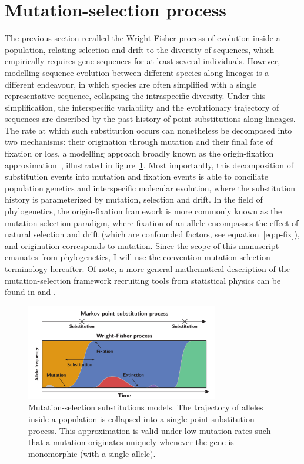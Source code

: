 \section{Mutation-selection process}
The previous section recalled the Wright-Fisher process of evolution inside a population, relating selection and drift to the diversity of sequences, which empirically requires gene sequences for at least several individuals.
However, modelling sequence evolution between different species along lineages is a different endeavour, in which species are often simplified with a single representative sequence, collapsing the intraspecific diversity.
Under this simplification, the interspecific variability and the evolutionary trajectory of sequences are described by the past history of point substitutions along lineages.
The rate at which such substitution occurs can nonetheless be decomposed into two mechanisms: their origination through mutation and their final fate of fixation or loss, a modelling approach broadly known as the origin-fixation approximation~\citep{McCandlish2014}, illustrated in figure~\ref{fig:point-process}.
Most importantly, this decomposition of substitution events into mutation and fixation events is able to conciliate population genetics and interspecific molecular evolution, where the substitution history is parameterized by mutation, selection and drift.
In the field of phylogenetics, the origin-fixation framework is more commonly known as the mutation-selection paradigm, where fixation of an allele encompasses the effect of natural selection and drift (which are confounded factors, see equation~\ref{eq:p-fix}), and origination corresponds to mutation.
Since the scope of this manuscript emanates from phylogenetics, I will use the convention mutation-selection terminology hereafter.
Of note, a more general mathematical description of the mutation-selection framework recruiting tools from statistical physics can be found in \citet{Sella2005} and \citet{Mustonen2009}.

\begin{figure}[H]
    \centering
    \includegraphics[width=0.75\textwidth]{figures/point-process.pdf}
    \caption[Mutation-selection substitutions models]{
    Mutation-selection substitutions models.
    The trajectory of alleles inside a population is collapsed into a single point substitution process.
    This approximation is valid under low mutation rates such that a mutation originates uniquely whenever the gene is monomorphic (with a single allele).}
    \label{fig:point-process}
\end{figure}

